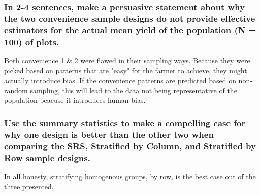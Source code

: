 \documentclass[letterpaper]{article}
\begin{document}
\subsubsection{In 2-4 sentences, make a persuasive statement about why the two convenience sample designs do not provide effective estimators for the actual mean yield of the population (N = 100) of plots.}\label{in-2-4-sentences-make-a-persuasive-statement-about-why-the-two-convenience-sample-designs-do-not-provide-effective-estimators-for-the-actual-mean-yield-of-the-population-n-100-of-plots.}

Both convenience 1 \& 2 were flawed in their sampling ways. Because they were picked based on patterns that are "easy" for the farmer to achieve, they might actually introduce bias. If the convenience patterns are predicted based on non-random sampling, this will lead to the data not being representative of the population beacuse it introduces human bias.

\subsubsection{Use the summary statistics to make a compelling case for why one design is better than the other two when comparing the SRS, Stratified by Column, and Stratified by Row sample designs.}\label{use-the-summary-statistics-to-make-a-compelling-case-for-why-one-design-is-better-than-the-other-two-when-comparing-the-srs-stratified-by-column-and-stratified-by-row-sample-designs.}

In all honesty, stratifying homogenous groups, by row, is the best case out of the three presented.
\end{document}

